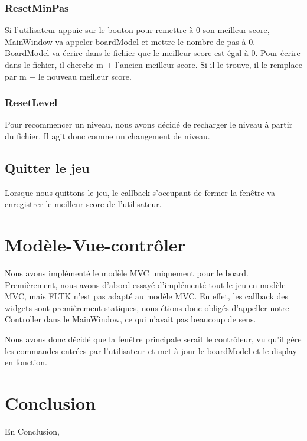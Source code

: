 \documentclass[utf8]{article}
\begin{document}
\begin{large}
\subsubsection{ResetMinPas}
\indent
\par
Si l'utilisateur appuie sur le bouton pour remettre à 0 son meilleur score,
MainWindow va appeler boardModel et mettre le nombre de pas à 0. BoardModel va
écrire dans le fichier que le meilleur score est égal à 0. Pour écrire dans le
fichier, il cherche m + l'ancien meilleur score. Si il le trouve, il le remplace
par m + le nouveau meilleur score.
\par

\subsubsection{ResetLevel}
Pour recommencer un niveau, nous avons décidé de recharger le niveau à partir du
fichier. Il agit donc comme un changement de niveau.
\subsection{Quitter le jeu}
\indent
\par
Lorsque nous quittons le jeu, le callback s'occupant de fermer la fenêtre va
enregistrer le meilleur score de l'utilisateur.
\par

\section{Modèle-Vue-contrôler}
\indent
\par
Nous avons implémenté le modèle MVC uniquement pour le board. Premièrement, nous
avons d'abord essayé d'implémenté tout le jeu en modèle MVC, mais FLTK n'est pas
adapté au modèle MVC. En effet, les callback des widgets sont premièrement
statiques, nous étions donc obligés d'appeller notre Controller dans le
MainWindow, ce qui n'avait pas beaucoup de sens. 
\par
Nous avons donc décidé que la
fenêtre principale serait le contrôleur, vu qu'il gère les commandes entrées
par l'utilisateur et met à jour le boardModel  et le display en fonction.
\par
\section{Conclusion}
\indent
\par
En Conclusion,
\par

\end{large}
\end{document}
